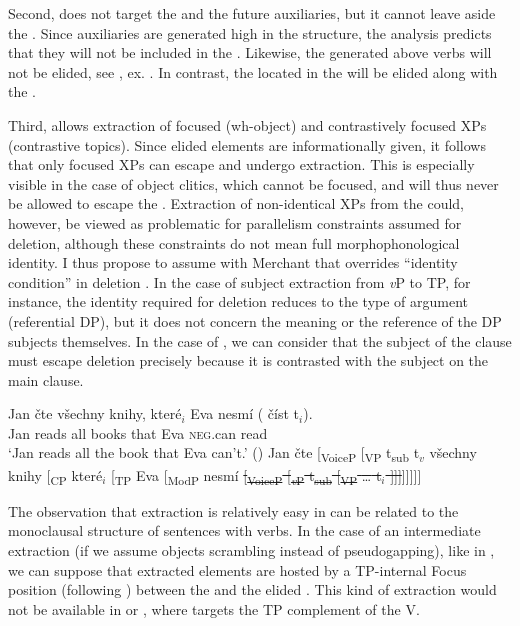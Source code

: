 \documentclass[output=paper,colorlinks,citecolor=brown,]{langsci/langscibook}
\begin{document}
Second,  does not target the  and the future auxiliaries, but it cannot leave aside the . Since  auxiliaries are generated high in the structure, the analysis predicts that they will not be included in the . Likewise, the  generated above  verbs will not be elided, see , ex. . In contrast, the  located in the  will be elided along with the .

Third,  allows extraction of focused (wh-object) and contrastively focused XPs (contrastive topics). Since elided elements are informationally given, it follows that only focused XPs can escape  and undergo extraction. This is especially visible in the case of  object clitics, which cannot be focused, and will thus never be allowed to escape the . Extraction of non-identical XPs from the  could, however, be viewed as problematic for parallelism constraints assumed for deletion, although these constraints do not mean full morphophonological identity. I thus propose to assume with Merchant that  overrides ``identity condition'' in deletion \citep{Merchant2001}. In the case of subject extraction from \textit{v}P to TP, for instance, the identity required for deletion reduces to the type of argument (referential DP), but it does not concern the meaning or the reference of the DP subjects themselves. In the case of , we can consider that the subject of the  clause must escape deletion precisely because it is contrasted with the subject on the main clause.

\ea
\ea \label{33a}
\gll Jan čte všechny knihy, které$_{i}$ Eva nesmí (\hspace{-2pt} číst t$_{i}$). \\
Jan reads all  books that    Eva \textsc{neg}.can  {} read\\
\glt `Jan reads all the book that Eva can't.' \hfill ()
\ex \label{33b}  Jan čte [\textsubscript{VoiceP} [\textsubscript{VP} t\textsubscript{sub} t$_{v}$ všechny knihy [\textsubscript{CP} které$_{i}$ [\textsubscript{TP} Eva [\textsubscript{ModP} nesmí \sout{[\textsubscript{VoiceP} [\textsubscript{\textit{v}P} t\textsubscript{sub} [\textsubscript{VP} {\ldots} t$_{i}$ ]]]}]]]]]
\z
\z

\noindent The observation that extraction is relatively easy in  can be related to the monoclausal structure of sentences with  verbs. In the case of an intermediate extraction (if we assume objects scrambling instead of pseudogapping), like in , we can suppose that extracted elements are hosted by a TP-internal Focus position (following \citealt{belletti2004aspects}) between the   and the elided . This kind of extraction would not be available in  or , where  targets the TP complement of the  V.
\end{document}
